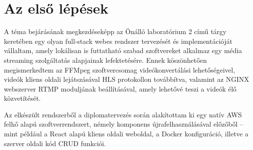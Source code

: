 \section{Az első lépések}

A téma bejárásának megkezdéseképp az Önálló laboratórium 2 című tárgy keretében egy olyan full-stack webes rendszer tervezését és implementációját vállaltam, amely lokálisan is futtatható szabad szoftvereket alkalmaz egy média streaming szolgáltatás alapjainak lefektetésére. Ennek köszönhetően megismerkedtem az FFMpeg szoftvercsomag videókonvertálási lehetőségeivel, videók kliens oldali lejátszásával HLS protokollon továbbítva, valamint az NGINX webszerver RTMP moduljának beállításával, amely lehetővé teszi a videók élő közvetítését.

Az elkészült rendszerből a diplomatervezés során alakítottam ki egy natív AWS felhő alapú szoftverrendszert, némely komponens újrafelhasználásával előzőből -- mint például a React alapú kliens oldali weboldal, a Docker konfiguráció, illetve a szerver oldali kód CRUD funkciói.
